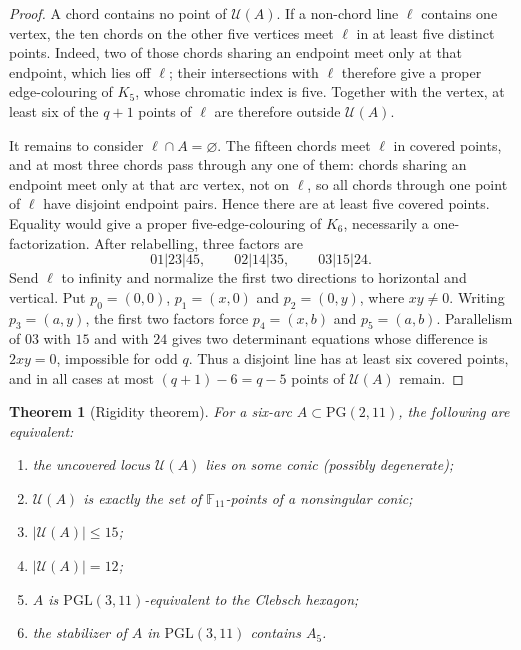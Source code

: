 \documentclass[11pt]{article}
\newtheorem{theorem}{Theorem}[section]
\theoremstyle{definition}
\theoremstyle{remark}
\newcommand{\PG}{\mathrm{PG}}
\newcommand{\F}{\mathbb{F}}
\newcommand{\cU}{\mathcal{U}}
\begin{document}
\begin{proof}
A chord contains no point of $\cU(A)$. If a non-chord line $\ell$ contains
one vertex, the ten chords on the other five vertices meet $\ell$ in at
least five distinct points. Indeed, two of those chords sharing an endpoint
meet only at that endpoint, which lies off $\ell$; their intersections with
$\ell$ therefore give a proper edge-colouring of $K_5$, whose chromatic
index is five. Together with the vertex, at least six of the $q+1$ points
of $\ell$ are therefore outside $\cU(A)$.

It remains to consider $\ell\cap A=\varnothing$. The fifteen chords meet
$\ell$ in covered points, and at most three chords pass through any one of
them: chords sharing an endpoint meet only at that arc vertex, not on
$\ell$, so all chords through one point of $\ell$ have disjoint endpoint
pairs. Hence there are at least five covered points. Equality would give a
proper five-edge-colouring of
$K_6$, necessarily a one-factorization. After relabelling, three factors
are
\[
  01|23|45,\qquad 02|14|35,\qquad 03|15|24.
\]
Send $\ell$ to infinity and normalize the first two directions to horizontal
and vertical. Put $p_0=(0,0)$, $p_1=(x,0)$ and $p_2=(0,y)$, where
$xy\ne0$. Writing $p_3=(a,y)$, the first two factors force
$p_4=(x,b)$ and $p_5=(a,b)$. Parallelism of $03$ with $15$ and with $24$
gives two determinant equations whose difference is $2xy=0$, impossible
for odd $q$. Thus a disjoint line has at least six covered points, and in
all cases at most $(q+1)-6=q-5$ points of $\cU(A)$ remain.
\end{proof}

\begin{theorem}[Rigidity theorem]
\label{thm:rigidity}
For a six-arc $A\subset\PG(2,11)$, the following are equivalent:
\begin{enumerate}[label=(\roman*),leftmargin=2em]
\item the uncovered locus $\cU(A)$ lies on some conic (possibly
degenerate);
\item $\cU(A)$ is exactly the set of $\F_{11}$-points of a nonsingular
conic;
\item $|\cU(A)|\le15$;
\item $|\cU(A)|=12$;
\item $A$ is $\mathrm{PGL}(3,11)$-equivalent to the Clebsch hexagon;
\item the stabilizer of $A$ in $\mathrm{PGL}(3,11)$ contains $A_5$.
\end{enumerate}
\end{theorem}
\end{document}
